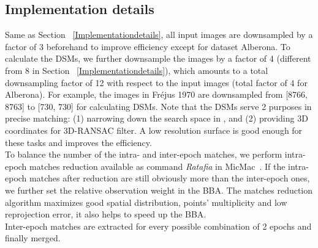 \subsection{Implementation details}
Same as Section ~\ref{Implementationdetails}, all input images are downsampled by a factor of 3 beforehand to improve efficiency except for dataset Alberona. To calculate the \ac{DSM}s, we further downsample the images by a factor of 4 (different from 8 in Section ~\ref{Implementationdetails}), which amounts to a total downsampling factor of 12 with respect to the input images (total factor of 4 for Alberona). For example, the images in Fr{\'e}jus 1970 are downsampled from [8766, 8763] to [730, 730] for calculating \ac{DSM}s. 
Note that the \ac{DSM}s serve 2 purposes in precise matching: (1) narrowing down the search space in , and (2) providing 3D coordinates for 3D-RANSAC filter. A low resolution surface is good enough for these tasks and improves the efficiency.\\
To balance the number of the intra- and inter-epoch matches, we perform intra-epoch matches reduction available as command \textit{Ratafia} in MicMac~\cite{marc2016micmac}. %
If the intra-epoch matches after reduction are still obviously more than the inter-epoch ones, we further set the relative observation weight in the \ac{BBA}. The matches reduction algorithm maximizes good spatial distribution, points' multiplicity and low reprojection error, it also helps to speed up the \ac{BBA}.\\
Inter-epoch matches are extracted {for every possible combination of 2 epochs and finally merged}.\\

